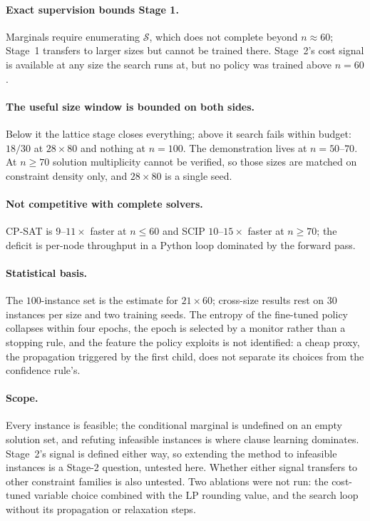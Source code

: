 \documentclass[final,5p,times,twocolumn,authoryear]{elsarticle}
\newcommand{\SOL}{\mathcal{S}}
\begin{document}
\paragraph{Exact supervision bounds Stage 1.} Marginals require enumerating $\SOL$, which does not complete beyond $n\approx60$; Stage~1 transfers to larger sizes but cannot be trained there. Stage~2's cost signal is available at any size the search runs at, but no policy was trained above $n=60$.

\paragraph{The useful size window is bounded on both sides.} Below it the lattice stage closes everything; above it search fails within budget: $18/30$ at $28\times80$ and nothing at $n=100$. The demonstration lives at $n=50$--$70$. At $n\ge70$ solution multiplicity cannot be verified, so those sizes are matched on constraint density only, and $28\times80$ is a single seed.

\paragraph{Not competitive with complete solvers.} CP-SAT is $9$--$11\times$ faster at $n\le60$ and SCIP $10$--$15\times$ faster at $n\ge70$; the deficit is per-node throughput in a Python loop dominated by the forward pass.

\paragraph{Statistical basis.} The $100$-instance set is the estimate for $21\times60$; cross-size results rest on $30$ instances per size and two training seeds. The entropy of the fine-tuned policy collapses within four epochs, the epoch is selected by a monitor rather than a stopping rule, and the feature the policy exploits is not identified: a cheap proxy, the propagation triggered by the first child, does not separate its choices from the confidence rule's.

\paragraph{Scope.} Every instance is feasible; the conditional marginal is undefined on an empty solution set, and refuting infeasible instances is where clause learning dominates. Stage~2's signal is defined either way, so extending the method to infeasible instances is a Stage-2 question, untested here. Whether either signal transfers to other constraint families is also untested. Two ablations were not run: the cost-tuned variable choice combined with the LP rounding value, and the search loop without its propagation or relaxation steps.
\end{document}
